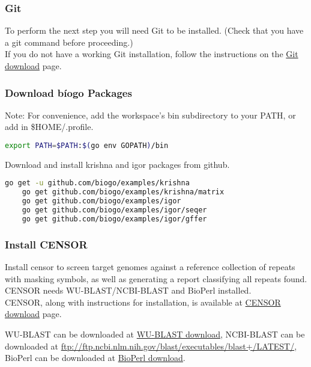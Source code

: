 \documentclass[a4paper,12pt]{article}
\begin{document}
	\subsubsection{Git}
	To perform the next step you will need Git to be installed. (Check that you have a git command before proceeding.) \\
	
	\noindent If you do not have a working Git installation, follow the instructions on the \href{https://git-scm.com/downloads}{\color{blue}Git download} page.
	
	\subsubsection{Download b\'iogo Packages}
	{\color{red} Note:}  For convenience, add the workspace's bin subdirectory to your PATH, or add in \$HOME/.profile. 
	\begin{lstlisting}[language=bash]
	export PATH=$PATH:$(go env GOPATH)/bin \end{lstlisting}
	\noindent Download and install krishna and igor packages from github. 
	
	\begin{lstlisting}[language=bash, columns=flexible]
	go get -u github.com/biogo/examples/krishna
	go get github.com/biogo/examples/krishna/matrix
	go get github.com/biogo/examples/igor
	go get github.com/biogo/examples/igor/seqer
	go get github.com/biogo/examples/igor/gffer \end{lstlisting}
	
	\subsubsection{ Install CENSOR}
	Install censor to screen target genomes against a reference collection of repeats with masking symbols, as well as generating a report classifying all repeats found. CENSOR needs WU-BLAST/NCBI-BLAST and BioPerl installed.\\
	
	\noindent CENSOR, along with instructions for installation, is available at \href{http://www.girinst.org/downloads/software/censor/} {\color{blue}CENSOR download} page.
	
	\noindent WU-BLAST can be downloaded at \href{https://www.advbiocomp.com/blast/obsolete/}{\color{blue}WU-BLAST download}, NCBI-BLAST can be downloaded at \url{ftp://ftp.ncbi.nlm.nih.gov/blast/executables/blast+/LATEST/}, BioPerl can be downloaded at \href{http://bioperl.org/INSTALL.html}{\color{blue}BioPerl download}.
\end{document}
